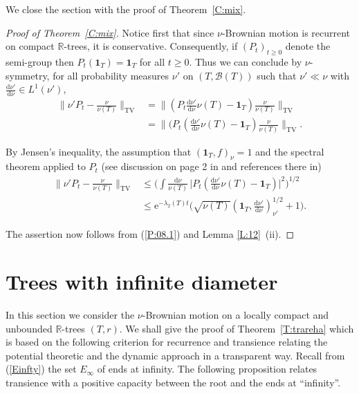 \documentclass[11pt]{amsart}
\numberwithin{equation}{section}
\begin{document}
{We close the section with the proof of Theorem~\ref{C:mix}.

\begin{proof}[Proof of Theorem~\ref{C:mix}] Notice first that since $\nu$-Brownian motion is recurrent on compact ${{\mathbb R}}$-trees, it is conservative.
Consequently, if $(P_t)_{t\ge 0}$ denote the semi-group  then $P_t(\mathbf{1}_T)=\mathbf{1}_T$ for all $t\ge 0$. Thus  we can conclude by $\nu$-symmetry,
for
all probability measures $\nu'$ on $(T,{\mathcal B}(T))$ such that $\nu'\ll\nu$ with  $\tfrac{\mathrm{d}\nu'}{\mathrm{d}\nu}\in L^1(\nu')$,
\begin{equation}\label{e:mix.2}
\begin{aligned}
   \big\|\nu' P_t-\tfrac{\nu}{\nu(T)}\big\|_{\mathrm{TV}}
 &=
   \big\|(P_t\tfrac{\mathrm{d}\nu'}{\mathrm{d}\nu}\nu(T)-\mathbf 1_T)\tfrac{\nu}{\nu(T)}\big\|_{\mathrm{TV}}
  \\
 &=
   \big\|(P_t(\tfrac{\mathrm{d}\nu'}{\mathrm{d}\nu}\nu(T)-\mathbf 1_T)\tfrac{\nu}{\nu(T)}\big\|_{\mathrm{TV}}.
\end{aligned}
\end{equation}

By Jensen's inequality, the assumption that $(\mathbf 1_T,f)_\nu=1$ and
the spectral theorem applied to $P_t$ (see discussion on page 2 in \cite{wang00} and references there in)
\begin{equation}\label{e:mix.3}
\begin{aligned}
   \big\|\nu' P_t-\tfrac{\nu}{\nu(T)}\big\|_{\mathrm{TV}}
 &\leq
   \Big(\int\tfrac{\mathrm{d}\nu}{\nu(T)}\,\big|P_t(\tfrac{\mathrm{d}\nu'}{\mathrm{d}\nu}\nu(T)-\mathbf 1_T)\big|^2\Big)^{1/2}
  \\
 &\leq
   \mathrm e^{-\lambda_2(T) t}\big(\sqrt{\nu(T)}(\mathbf{1}_T,\tfrac{\mathrm{d}\nu'}{\mathrm{d}\nu})_{\nu'}^{1/2}+1\big).
\end{aligned}
\end{equation}

The assertion now follows from (\ref{P:08.1}) and Lemma \ref{L:12}~(ii).
\end{proof}{\smallskip}

\section{Trees with infinite diameter}
\label{S:transinfty}

In this section we consider the $\nu$-Brownian motion on a locally compact and unbounded ${{\mathbb R}}$-trees $(T,r)$. We shall give the proof of Theorem~\ref{T:trareha} which is based on the following criterion for recurrence and transience
relating the potential theoretic and the dynamic
approach in a transparent way. Recall from (\ref{Einfty}) the set $E_\infty$ of ends at infinity.
The following proposition relates transience with a positive capacity between the root and the ends at ``infinity''.

}
\end{document}
